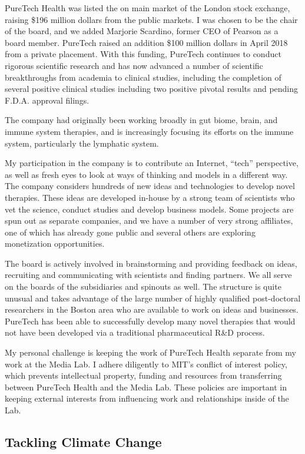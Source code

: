PureTech Health was listed the on main market of the London stock exchange, raising \$196 million dollars from the public markets. I was chosen to be the chair of the board, and we added Marjorie Scardino, former CEO of Pearson as a board member. PureTech raised an addition \$100 million dollars in April 2018 from a private placement. With this funding, PureTech continues to conduct rigorous scientific research and has now advanced a number of scientific breakthroughs from academia to clinical studies, including the completion of several positive clinical studies including two positive pivotal results and pending F.D.A. approval filings.

The company had originally been working broadly in gut biome, brain, and immune system therapies, and is increasingly focusing its efforts on the immune system, particularly the lymphatic system.

My participation in the company is to contribute an Internet, ``tech'' perspective, as well as fresh eyes to look at ways of thinking and models in a different way. The company considers hundreds of new ideas and technologies to develop novel therapies. These ideas are developed in-house by a strong team of scientists who vet the science, conduct studies and develop business models. Some projects are spun out as separate companies, and we have a number of very strong affiliates, one of which has already gone public and several others are exploring monetization opportunities. 

The board is actively involved in brainstorming and providing feedback on ideas, recruiting and communicating with scientists and finding partners. We all serve on the boards of the subsidiaries and spinouts as well. The structure is quite unusual and takes advantage of the large number of highly qualified post-doctoral researchers in the Boston area who are available to work on ideas and businesses. PureTech has been able to successfully develop many novel therapies that would not have been developed via a traditional pharmaceutical R\&D process.

My personal challenge is keeping the work of PureTech Health separate from my work at the Media Lab. I adhere diligently to MIT’s conflict of interest policy, which prevents intellectual property, funding and resources from transferring between PureTech Health and the Media Lab. These policies are important in keeping external interests from influencing work and relationships inside of the Lab. 

\subsection{Tackling Climate Change}
\label{climatepractice}

